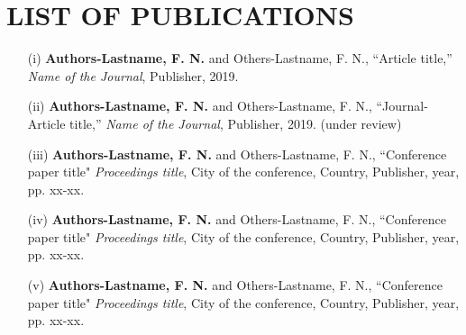 \cleardoublepage
{}
{}
\chapter*{\large LIST OF PUBLICATIONS}
\label{listofpublications}



\begin{enumerate}
\item[(i)] 
\textbf{Authors-Lastname, F. N.} and Others-Lastname, F. N., 
``Article title,''
\emph{Name of the Journal}, 
Publisher, 2019.

\item[(ii)] 
\textbf{Authors-Lastname, F. N.} and Others-Lastname, F. N., 
``Journal-Article title,''
\emph{Name of the Journal}, 
Publisher, 2019. (under review)

\end{enumerate}
%
%
\begin{enumerate}

\item[(iii)] 
\textbf{Authors-Lastname, F. N.} and Others-Lastname, F. N., 
``Conference paper title" 
\textit{Proceedings title}, 
City of the conference,
Country,
Publisher, 
year,
pp. xx-xx. 

\item[(iv)]
\textbf{Authors-Lastname, F. N.} and Others-Lastname, F. N., 
``Conference paper title" 
\textit{Proceedings title}, 
City of the conference,
Country,
Publisher, 
year,
pp. xx-xx. 


\item[(v)]
\textbf{Authors-Lastname, F. N.} and Others-Lastname, F. N., 
``Conference paper title" 
\textit{Proceedings title}, 
City of the conference,
Country,
Publisher, 
year,
pp. xx-xx. 


\end{enumerate}



%
